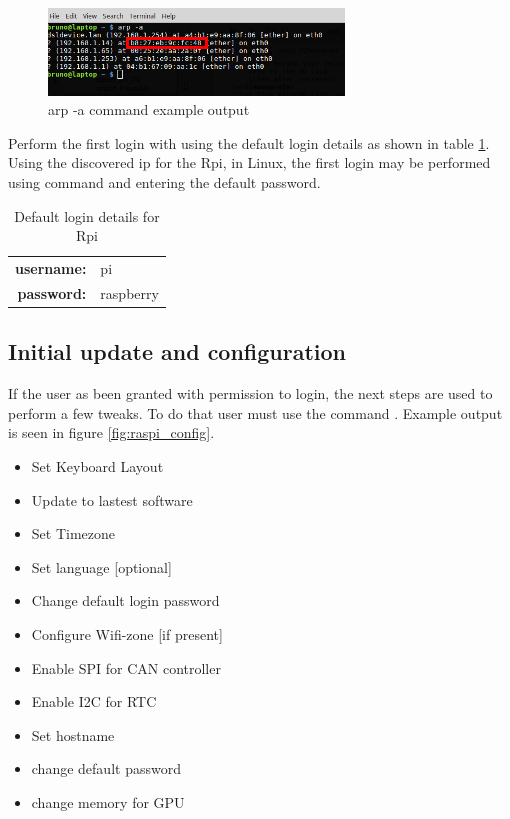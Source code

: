 \begin{figure}[hb]
	\centering
	\includegraphics[width=0.7\textwidth]{figures/arp_example}
	\caption{arp -a command example output}
	\label{arp_example}
\end{figure}

Perform the first login with using the default login details as shown in table \ref{tab:default_login}.
Using the discovered ip for the \gls{Rpi}, in Linux, the first login  may be performed using  command and entering the default password.
\begin{table}[h]
	\centering
	\begin{tabular}{rl}
		\toprule
		\textbf{username:}& pi\\
		\textbf{password:}& raspberry\\
		\bottomrule
	\end{tabular}
	\caption{Default login details for \gls{Rpi}}
	\label{tab:default_login}
\end{table}

\subsection{Initial update and configuration}
If the user as been granted with permission to login, the next steps are used to perform a few tweaks.
To do that user must use the command . Example output is seen in figure \ref{fig:raspi_config}.

\begin{itemize}
	\tightlist
	\item Set Keyboard Layout
	\item Update to lastest software
	\item Set Timezone
	\item Set language [optional]
	\item Change default login password
	\item Configure Wifi-zone [if present]
	\item Enable \gls{SPI} for CAN controller
	\item Enable \gls{I2C} for RTC
	\item Set hostname
	\item change default password
	\item change memory for GPU
\end{itemize}

